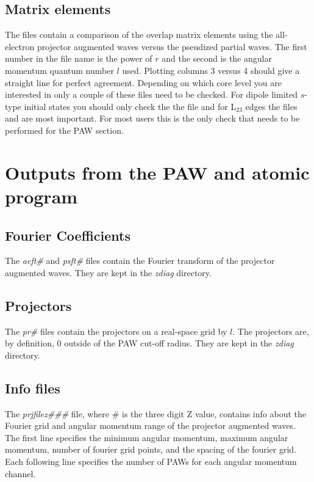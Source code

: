 \documentclass[11pt]{report}
\begin{document}
\subsection{Matrix elements}
The  files contain a comparison of the overlap matrix elements using the all-electron projector augmented waves versus the pseudized partial waves. The first number in the 
file name is the power of $r$ and the second is the angular momentum quantum number $l$ used. Plotting columns 3 versus 4 should give a straight line for perfect 
agreement. Depending on which core level you are interested in only a couple of these files need to be checked. For dipole limited $s$-type initial states you should only check the the file  and for L$_{23}$ edges the files  and  are most important. For most users this is the only check that needs to be performed for the PAW section.

\section{Outputs from the PAW and atomic program}

\subsection{Fourier Coefficients}
The \emph{aeft\#} and \emph{psft\#} files contain the Fourier transform of the projector augmented waves. They are kept in the \emph{zdiag} directory.

\subsection{Projectors}
The \emph{pr\#} files contain the projectors on a real-space grid by $l$. The projectors are, by definition, 0 outside of the PAW cut-off radius. They are kept in the \emph{zdiag} directory.

\subsection{Info files}
The \emph{prjfilez\#\#\#} file, where \# is the three digit Z value, contains info about the Fourier grid and angular momentum range of the projector augmented waves. The first line specifies the minimum angular momentum, maximum angular momentum, number of fourier grid points, and the spacing of the fourier grid. Each following line specifies the number of PAWs for each angular momentum channel. 
\end{document}
